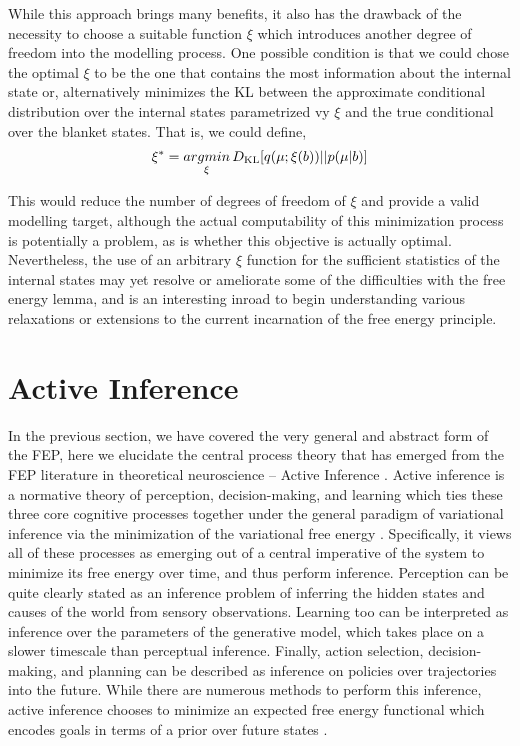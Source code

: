 While this approach brings many benefits, it also has the drawback of the necessity to choose a suitable function $\xi$ which introduces another degree of freedom into the modelling process. One possible condition is that we could chose the optimal $\xi$ to be the one that contains the most information about the internal state or, alternatively minimizes the KL between the approximate conditional distribution over the internal states parametrized vy $\xi$ and the true conditional over the blanket states. That is, we could define,
\begin{align*}
  \xi^* = \underset{\xi}{argmin} \, D_\mathrm{KL}[q(\mu; \xi(b)) || p(\mu | b)]
\end{align*}

This would reduce the number of degrees of freedom of $\xi$ and provide a valid modelling target, although the actual computability of this minimization process is potentially a problem, as is whether this objective is actually optimal. Nevertheless, the use of an arbitrary $\xi$ function for the sufficient statistics of the internal states may yet resolve or ameliorate some of the difficulties with the free energy lemma, and is an interesting inroad to begin understanding various relaxations or extensions to the current incarnation of the free energy principle.

\section{Active Inference}

In the previous section, we have covered the very general and abstract form of the FEP, here we elucidate the central process theory that has emerged from the FEP literature in theoretical neuroscience -- Active Inference \citep{friston2012active,friston2009reinforcement}. Active inference is a normative theory of perception, decision-making, and learning which ties these three core cognitive processes together under the general paradigm of variational inference via the minimization of the variational free energy \citep{friston2015active,friston2017process}. Specifically, it views all of these processes as emerging out of a central imperative of the system to minimize its free energy over time, and thus perform inference. Perception can be quite clearly stated as an inference problem of inferring the hidden states and causes of the world from sensory observations. Learning too can be interpreted as inference over the parameters of the generative model, which takes place on a slower timescale than perceptual inference. Finally, action selection, decision-making, and planning can be described as inference on policies over trajectories into the future. While there are numerous methods to perform this inference, active inference chooses to minimize an expected free energy functional which encodes goals in terms of a prior over future states \citep{da2020active}.

